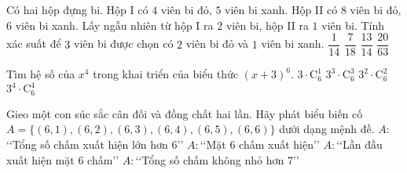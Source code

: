 \begin{ex}%
Có hai hộp đựng bi. Hộp I có $ 4 $ viên bi đỏ, $ 5 $ viên bi xanh. Hộp II có $ 8 $ viên bi đỏ, $ 6 $ viên bi xanh. Lấy ngẫu nhiên từ hộp I ra $ 2 $ viên bi, hộp II ra $ 1 $ viên bi. Tính xác suất để $ 3 $ viên bi được chọn có $ 2 $ viên bi đỏ và $ 1 $ viên bi xanh.
\choice
{$ \dfrac{1}{14} $}
{\True $ \dfrac{7}{18} $}
{$ \dfrac{13}{14} $}
{$ \dfrac{20}{63} $}
\end{ex}

\begin{ex}%
Tìm hệ số của $ x^4 $ trong khai triển của biểu thức $ (x+3)^6 $.
\choice
{$ 3\cdot\mathrm{C}_6^1 $}
{$ 3^3\cdot\mathrm{C}_6^3 $}
{\True $ 3^2\cdot\mathrm{C}_6^2 $}
{$ 3^4\cdot\mathrm{C}_6^4 $}
\end{ex}

\begin{ex}%
Gieo một con súc sắc cân đối và đồng chất hai lần. Hãy phát biểu biến cố $ A=\{(6, 1), (6, 2), (6, 3), (6,4), (6, 5), (6, 6)\} $ dưới dạng mệnh đề.
\choice
{$ A\colon$\lq\lq Tổng số chấm xuất hiện lớn hơn $ 6 $\rq\rq}
{$ A\colon$\lq\lq Mặt $ 6 $ chấm xuất hiện\rq\rq}
{\True $ A\colon$\lq\lq Lần đầu xuất hiện mặt $ 6 $ chấm\rq\rq}
{$ A\colon$\lq\lq Tổng số chấm không nhỏ hơn $ 7 $\rq\rq}
\end{ex}

